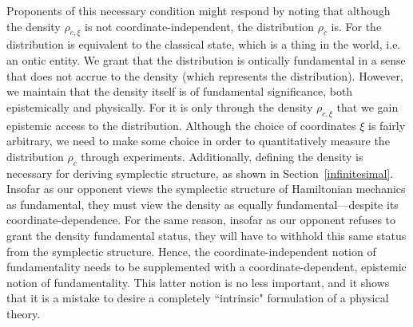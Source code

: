 \documentclass[letterpaper]{article}
\begin{document}
Proponents of this necessary condition might respond by noting that although the density $\rho_{c, \xi}$ is not coordinate-independent, the distribution $\rho_{c}$ is. For the distribution is equivalent to the classical state, which is a thing in the world, i.e. an ontic entity. We grant that the distribution is ontically fundamental in a sense that does not accrue to the density (which represents the distribution). However, we maintain that the density itself is of fundamental significance, both epistemically and physically. For it is only through the density $\rho_{c, \xi}$ that we gain epistemic access to the distribution. Although the choice of coordinates $\xi$ is fairly arbitrary, we need to make some choice in order to quantitatively measure the distribution $\rho_{c}$ through experiments. Additionally, defining the density is necessary for deriving symplectic structure, as shown in Section~\ref{infinitesimal}. Insofar as our opponent views the symplectic structure of Hamiltonian mechanics as fundamental, they must view the density as equally fundamental---despite its coordinate-dependence. For the same reason, insofar as our opponent refuses to grant the density fundamental status, they will have to withhold this same status from the symplectic structure. Hence, the coordinate-independent notion of fundamentality needs to be supplemented with a coordinate-dependent, epistemic notion of fundamentality. This latter notion is no less important, and it shows that it is a mistake to desire a completely ``intrinsic" formulation of a physical theory.
\end{document}
